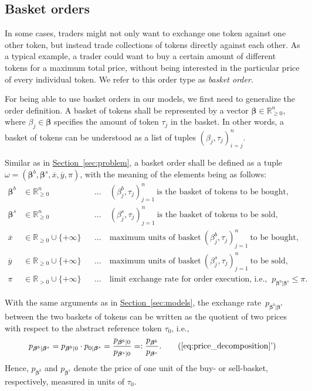 \documentclass[11pt,parskip=full]{scrartcl}%
\newcommand*{\ie}{i.e., }
\newcommand*{\secref}[1]{\hyperref[{#1}]{Section~\ref*{#1}}}
\begin{document}
\newpage
\subsection{Basket orders}
\label{subsec:basket_orders}

In some cases, traders might not only want to exchange one token against one other token, but
instead trade collections of tokens directly against each other.
As a typical example, a trader could want to buy a certain amount of different tokens for a maximum
total price, without being interested in the particular price of every individual token.
We refer to this order type as \emph{basket order}.

For being able to use basket orders in our models, we first need to generalize the order
definition.
A basket of tokens shall be represented by a vector $\bm{\beta} \in \mathbb{R}^n_{\ge 0}$, where
$\beta_j \in \bm{\beta}$ specifies the amount of token $\tau_j$ in the basket.
In other words, a basket of tokens can be understood as a list of tuples
$(\beta_j, \tau_j)_{i=j}^n$.

Similar as in \secref{sec:problem}, a basket order shall be defined as a tuple
$\omega = (\bm{\beta}^b, \bm{\beta}^s, \overline{x}, \overline{y}, \pi)$, with the meaning of the
elements being as follows:
\begin{align*}
  \bm{\beta}^b &\in \mathbb{R}^n_{\ge 0} &&
    \ldots \quad (\beta^b_j,\tau_j)_{j=1}^n \> \text{is the basket of tokens to be bought,}\\
  \bm{\beta}^s &\in \mathbb{R}^n_{\ge 0} &&
    \ldots \quad (\beta^s_j,\tau_j)_{j=1}^n \> \text{is the basket of tokens to be sold,}\\
  \overline{x} &\in \mathbb{R}_{\ge 0} \cup \{+\infty\} &&
    \ldots \quad \text{maximum units of basket} \> (\beta^b_j,\tau_j)_{j=1}^n \> \text{to be
    bought,}\\
  \overline{y} &\in \mathbb{R}_{\ge 0} \cup \{+\infty\} &&
    \ldots \quad \text{maximum units of basket} \> (\beta^s_j,\tau_j)_{j=1}^n \> \text{to be
    sold,}\\
  \pi &\in \mathbb{R}_{>0} \cup \{+\infty\} &&
    \ldots \quad \text{limit exchange rate for order execution, \ie}
    \> p_{\bm{\beta}^b|\bm{\beta}^s} \le \pi.
\end{align*}

With the same arguments as in \secref{sec:models}, the exchange rate~$p_{\bm{\beta}^b|\bm{\beta}^s}$
between the two baskets of tokens can be written as the quotient of two prices with respect to the
abstract reference token $\tau_0$, \ie
\begin{align}
  p_{\bm{\beta}^b|\bm{\beta}^s} =
  p_{\bm{\beta}^b|0} \cdot p_{0|\bm{\beta}^s} =
  \frac{p_{\bm{\beta}^b|0}}{p_{\bm{\beta}^s|0}} =:
  \frac{p_{\bm{\beta}^b}}{p_{\bm{\beta}^s}}.
  \tag{\ref{eq:price_decomposition}'}
\end{align}
Hence, $p_{\bm{\beta}^b}$ and $p_{\bm{\beta}^s}$ denote the price of one unit of the buy- or
sell-basket, respectively, measured in units of $\tau_0$.
\end{document}
